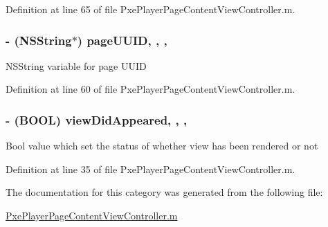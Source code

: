 Definition at line 65 of file Pxe\-Player\-Page\-Content\-View\-Controller.\-m.

\hypertarget{category_pxe_player_page_content_view_controller_07_08_a6018e38b2c25be9266b21662eb93f0a1}{
\subsubsection[{page\-U\-U\-I\-D}]{\setlength{\rightskip}{0pt plus 5cm}-\/ (N\-S\-String$\ast$) page\-U\-U\-I\-D\hspace{0.3cm}{\ttfamily [read]}, {\ttfamily [write]}, {\ttfamily [nonatomic]}, {\ttfamily [strong]}}}\label{category_pxe_player_page_content_view_controller_07_08_a6018e38b2c25be9266b21662eb93f0a1}
N\-S\-String variable for page U\-U\-I\-D 

Definition at line 60 of file Pxe\-Player\-Page\-Content\-View\-Controller.\-m.

\hypertarget{category_pxe_player_page_content_view_controller_07_08_af3d11a7f11a11796661c27580d6ce029}{
\subsubsection[{view\-Did\-Appeared}]{\setlength{\rightskip}{0pt plus 5cm}-\/ (B\-O\-O\-L) view\-Did\-Appeared\hspace{0.3cm}{\ttfamily [read]}, {\ttfamily [write]}, {\ttfamily [nonatomic]}, {\ttfamily [assign]}}}\label{category_pxe_player_page_content_view_controller_07_08_af3d11a7f11a11796661c27580d6ce029}
Bool value which set the status of whether view has been rendered or not 

Definition at line 35 of file Pxe\-Player\-Page\-Content\-View\-Controller.\-m.



The documentation for this category was generated from the following file\-:\begin{DoxyCompactItemize}
\item 
\hyperlink{_pxe_player_page_content_view_controller_8m}{Pxe\-Player\-Page\-Content\-View\-Controller.\-m}\end{DoxyCompactItemize}
